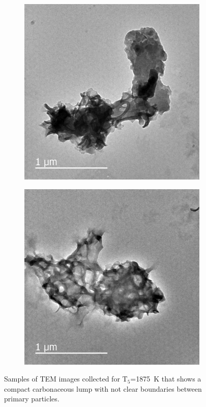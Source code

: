 \begin{figure}[H]
    \centering
    \begin{subfigure}[t]{0.32\textwidth}
        \includegraphics[width=1\textwidth]{Figures/1875K.jpg}
    \end{subfigure}
    \begin{subfigure}[t]{0.32\textwidth}
        \includegraphics[width=1\textwidth]{Figures/1875K_2.jpg}
    \end{subfigure}
	\caption{Samples of TEM images collected for $\mathrm{T_5}$=1875~K that shows a compact carbonaceous lump with not clear boundaries between primary particles.}
	\label{fig:tem1875} 
\end{figure}

